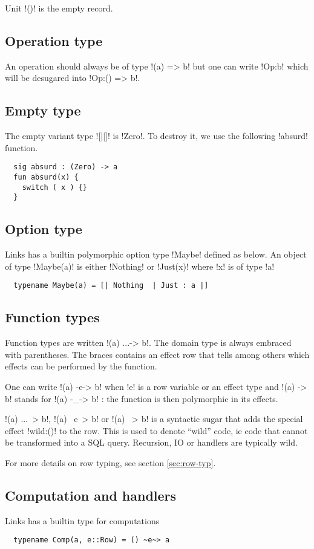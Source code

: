 \documentclass[11pt, nonacm=true, language=french, language=english]{acmart}
\begin{document}
Unit !()! is the empty record.


\subsection{Operation type}
\label{sec:operation-type}
An operation should always be of type !(a) => b! but one can write !Op:b! which will be desugared into !Op:() => b!.

\subsection{Empty type}
\label{sec:tech:zero}
The empty variant type ![||]! is !Zero!. To destroy it, we use the following !absurd! function.
\begin{lstlisting}
  sig absurd : (Zero) -> a
  fun absurd(x) {
    switch ( x ) {}
  }
\end{lstlisting}

\subsection{Option type}
\label{sec:tech:maybe}
Links has a builtin polymorphic option type !Maybe! defined as below. An object of type !Maybe(a)! is either !Nothing! or !Just(x)! where !x! is of type !a!
\begin{lstlisting}
  typename Maybe(a) = [| Nothing  | Just : a |]
\end{lstlisting}

\subsection{Function types}
Function types are written !(a) {...}-> b!. The domain type is always embraced with parentheses. The braces contains an effect row that tells among others which effects can be performed by the function.

One can write !(a) -e-> b! when !e! is a row variable or an effect type and !(a) -> b! stands for !(a) -_-> b! : the function is then polymorphic in its effects.

!(a) {...}~> b!, !(a) ~e~> b! or !(a) ~> b! is a syntactic sugar that adds the special effect !wild:()! to the row. This is used to denote ``wild'' code, ie code that cannot be transformed into a SQL query. Recursion, IO or handlers are typically wild. \citep{}

For more details on row typing, see section \ref{sec:row-typ}.

\subsection{Computation and handlers}
\label{sec:computation-handlers}
Links has a builtin type for computations
\begin{lstlisting}
  typename Comp(a, e::Row) = () ~e~> a
\end{lstlisting}
\end{document}
